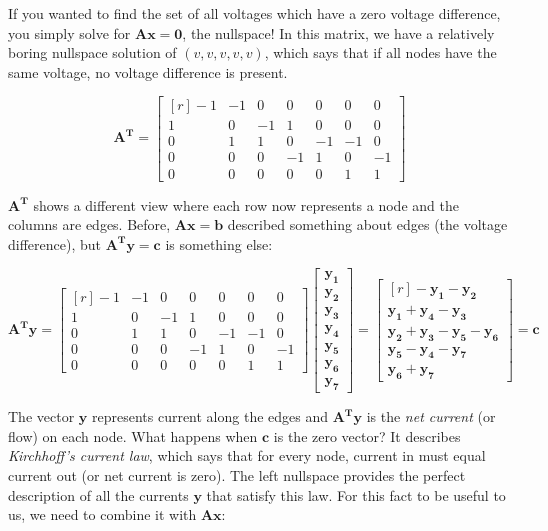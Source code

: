 \documentclass[11pt]{article} %
\begin{document}
If you wanted to find the set of all voltages which have a zero
voltage difference, you simply solve for $\bm{Ax} = \bm{0}$, the
nullspace!  In this matrix, we have a relatively boring nullspace
solution of $(v, v, v, v, v)$, which says that if all nodes have the
same voltage, no voltage difference is present.

\[
\bm{A^T} = \begin{bmatrix*}[r]
  -1 & -1 & 0 & 0 & 0 & 0 & 0 \\
  1 & 0 & -1 & 1 & 0 & 0 & 0 \\
  0 & 1 & 1 & 0 & -1 & -1 & 0 \\
  0 & 0 & 0 & -1 & 1 & 0 & -1 \\
  0 & 0 & 0 & 0 & 0 & 1 & 1
\end{bmatrix*}
\]

$\bm{A^T}$ shows a different view where each row now represents a node
and the columns are edges.  Before, $\bm{Ax} = \bm{b}$ described
something about edges (the voltage difference), but $\bm{A^Ty} =
\bm{c}$ is something else:

\[
\bm{A^Ty} =
\begin{bmatrix*}[r]
  -1 & -1 & 0 & 0 & 0 & 0 & 0 \\
  1 & 0 & -1 & 1 & 0 & 0 & 0 \\
  0 & 1 & 1 & 0 & -1 & -1 & 0 \\
  0 & 0 & 0 & -1 & 1 & 0 & -1 \\
  0 & 0 & 0 & 0 & 0 & 1 & 1
\end{bmatrix*}
\begin{bmatrix} \bm{y_1} \\ \bm{y_2} \\ \bm{y_3} \\ \bm{y_4} \\ \bm{y_5} \\ \bm{y_6} \\ \bm{y_7} \end{bmatrix} =
\begin{bmatrix*}[r]
  -\bm{y_1} - \bm{y_2} \\
  \bm{y_1} + \bm{y_4} - \bm{y_3} \\
  \bm{y_2} + \bm{y_3} - \bm{y_5} - \bm{y_6} \\
  \bm{y_5} - \bm{y_4} - \bm{y_7} \\
  \bm{y_6} + \bm{y_7}
\end{bmatrix*} = \bm{c}
\]

The vector $\bm{y}$ represents current along the edges and $\bm{A^Ty}$
is the \textit{net current} (or flow) on each node.  What happens when
$\bm{c}$ is the zero vector?  It describes \emph{Kirchhoff's current
  law}, which says that for every node, current in must equal current
out (or net current is zero).  The left nullspace provides the perfect
description of all the currents $\bm{y}$ that satisfy this law.  For
this fact to be useful to us, we need to combine it with $\bm{Ax}$:
\end{document}
